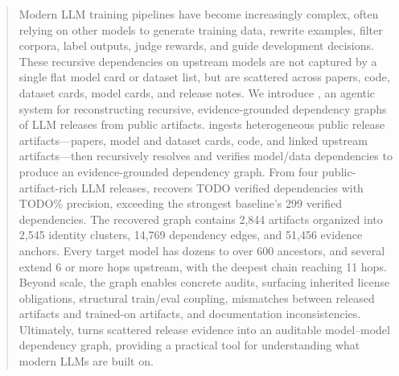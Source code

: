 \begin{abstract}
Modern LLM training pipelines have become increasingly complex, often relying on other models to generate training data, rewrite examples, filter corpora, label outputs, judge rewards, and guide development decisions. These recursive dependencies on upstream models are not captured by a single flat model card or dataset list, but are scattered across papers, code, dataset cards, model cards, and release notes. We introduce \system{}, an agentic system for reconstructing recursive, evidence-grounded dependency graphs of LLM releases from public artifacts. \system{} ingests heterogeneous public release artifacts---papers, model and dataset cards, code, and linked upstream artifacts---then recursively resolves and verifies model/data dependencies to produce an evidence-grounded dependency graph. From four public-artifact-rich LLM releases, \system{} recovers TODO verified dependencies with TODO\% precision, exceeding the strongest baseline's 299 verified dependencies. The recovered graph contains 2,844 artifacts organized into 2,545 identity clusters, 14,769 dependency edges, and 51,456 evidence anchors. Every target model has dozens to over 600 ancestors, and several extend 6 or more hops upstream, with the deepest chain reaching 11 hops. Beyond scale, the graph enables concrete audits, surfacing inherited license obligations, structural train/eval coupling, mismatches between released artifacts and trained-on artifacts, and documentation inconsistencies. Ultimately, \system{} turns scattered release evidence into an auditable model--model dependency graph, providing a practical tool for understanding what modern LLMs are built on.
\end{abstract}
